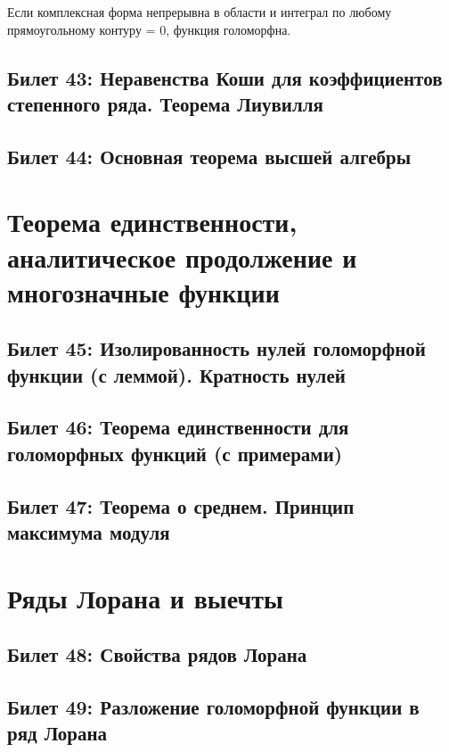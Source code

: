 \documentclass[12pt, a4paper, oneside]{memoir}
\begin{document}
\begin{theorem}
    [Мореры]

    Если комплексная форма непрерывна в области и интеграл по любому прямоугольному контуру = 0, функция голоморфна.
\end{theorem}

\subsection{Билет 43: Неравенства Коши для коэффициентов степенного ряда. Теорема Лиувилля}

\subsection{Билет 44: Основная теорема высшей алгебры}




\section{Теорема единственности, аналитическое продолжение и многозначные функции}


\subsection{Билет 45: Изолированность нулей голоморфной функции (с леммой). Кратность нулей}

\subsection{Билет 46: Теорема единственности для голоморфных функций (с примерами)}

\subsection{Билет 47: Теорема о среднем. Принцип максимума модуля}




\section{Ряды Лорана и выечты}

\subsection{Билет 48: Свойства рядов Лорана}

\subsection{Билет 49: Разложение голоморфной функции в ряд Лорана}
\end{document}
